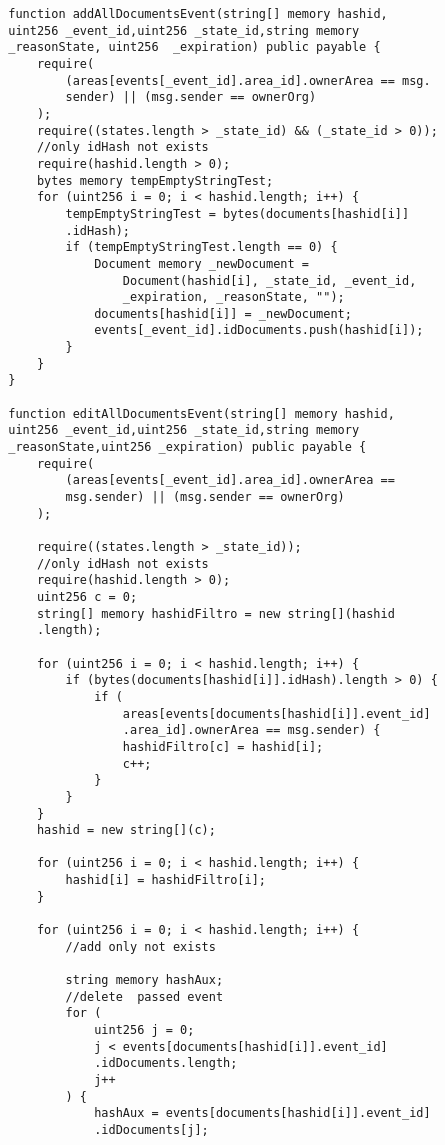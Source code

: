 \begin{verbatim}
        function addAllDocumentsEvent(string[] memory hashid,
        uint256 _event_id,uint256 _state_id,string memory 
        _reasonState, uint256  _expiration) public payable {
            require(
                (areas[events[_event_id].area_id].ownerArea == msg.
                sender) || (msg.sender == ownerOrg)
            );
            require((states.length > _state_id) && (_state_id > 0));
            //only idHash not exists
            require(hashid.length > 0);
            bytes memory tempEmptyStringTest;
            for (uint256 i = 0; i < hashid.length; i++) {
                tempEmptyStringTest = bytes(documents[hashid[i]]
                .idHash);
                if (tempEmptyStringTest.length == 0) {
                    Document memory _newDocument =
                        Document(hashid[i], _state_id, _event_id,
                        _expiration, _reasonState, "");
                    documents[hashid[i]] = _newDocument;
                    events[_event_id].idDocuments.push(hashid[i]);
                }
            }
        }
    
        function editAllDocumentsEvent(string[] memory hashid,
        uint256 _event_id,uint256 _state_id,string memory 
        _reasonState,uint256 _expiration) public payable {
            require(
                (areas[events[_event_id].area_id].ownerArea == 
                msg.sender) || (msg.sender == ownerOrg)
            );
    
            require((states.length > _state_id));
            //only idHash not exists
            require(hashid.length > 0);
            uint256 c = 0;
            string[] memory hashidFiltro = new string[](hashid
            .length);
    
            for (uint256 i = 0; i < hashid.length; i++) {
                if (bytes(documents[hashid[i]].idHash).length > 0) {
                    if (
                        areas[events[documents[hashid[i]].event_id]
                        .area_id].ownerArea == msg.sender) {
                        hashidFiltro[c] = hashid[i];
                        c++;
                    }
                }
            }
            hashid = new string[](c);
    
            for (uint256 i = 0; i < hashid.length; i++) {
                hashid[i] = hashidFiltro[i];
            }
    
            for (uint256 i = 0; i < hashid.length; i++) {
                //add only not exists
    
                string memory hashAux;
                //delete  passed event
                for (
                    uint256 j = 0;
                    j < events[documents[hashid[i]].event_id]
                    .idDocuments.length;
                    j++
                ) {
                    hashAux = events[documents[hashid[i]].event_id]
                    .idDocuments[j];
    

\end{verbatim}
